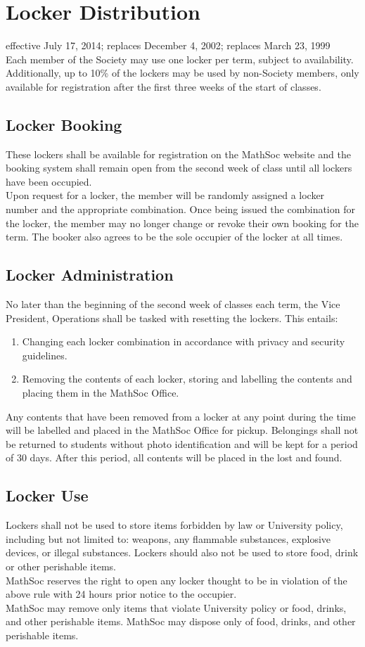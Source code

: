 \section{Locker Distribution}
effective July 17, 2014; replaces December 4, 2002; replaces March 23, 1999\\

Each member of the Society may use one locker per term, subject to availability. Additionally, up to 10\% of the lockers may be used by non-Society members, only available for registration after the first three weeks of the start of classes.

\subsection{Locker Booking}
These lockers shall be available for registration on the MathSoc website and the booking system shall remain open from the second week of class until all lockers have been occupied.\\
Upon request for a locker, the member will be randomly assigned a locker number and the appropriate combination. Once being issued the combination for the locker, the member may no longer change or revoke their own booking for the term. The booker also agrees to be the sole occupier of the locker at all times.

\subsection{Locker Administration}
No later than the beginning of the second week of classes each term, the Vice President, Operations shall be tasked with resetting the lockers. This entails:
\begin{enumerate}
\item Changing each locker combination in accordance with privacy and security guidelines.
\item Removing the contents of each locker, storing and labelling the contents and placing them in the MathSoc Office.
\end{enumerate}
Any contents that have been removed from a locker at any point during the time will be labelled and placed in the MathSoc Office for pickup. Belongings shall not be returned to students without photo identification and will be kept for a period of 30 days. After this period, all contents will be placed in the lost and found.

\subsection{Locker Use}
Lockers shall not be used to store items forbidden by law or University policy, including but not limited to: weapons, any flammable substances, explosive devices, or illegal substances. Lockers should also not be used to store food, drink or other perishable items.\\
MathSoc reserves the right to open any locker thought to be in violation of the above rule with 24 hours prior notice to the occupier.\\
MathSoc may remove only items that violate University policy or food, drinks, and other perishable items. MathSoc may dispose only of food, drinks, and other perishable items.
